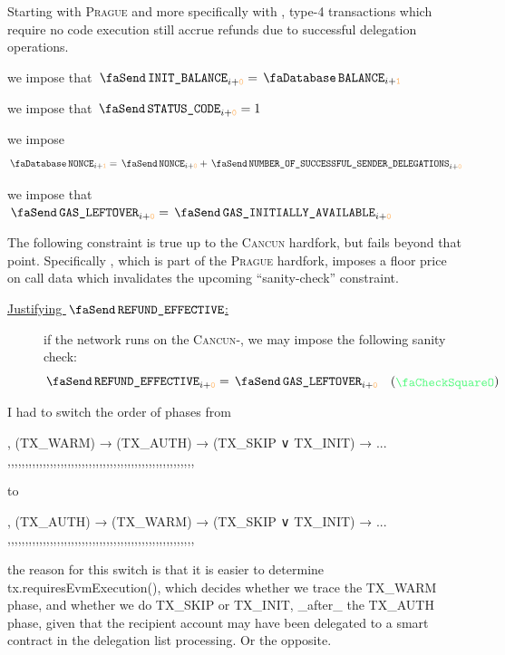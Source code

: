 \begin{description}
			\saNote{}
			Starting with \textsc{Prague} and more specifically with
			\cite{EIP-7702}, type-4 transactions which require no code execution
			still accrue refunds due to successful delegation operations.
		\item[\underline{Justifying $\txInitialBalance$:}]
			we impose that $\txInitialBalance _{i + \roffTxSkipUserTransaction} = \accBalance _{i + \roffTxSkipUserSenderAccount}$
		\item[\underline{Justifying \txStatusCode{}:}]
			we impose that $\txStatusCode _{i + \roffTxSkipUserTransaction} = 1$
		\item[\underline{Justifying \txNonce{}:}]
			we impose
			\[
				\accNonce                              _{i + \roffTxSkipUserSenderAccount} =
				\txNonce                               _{i + \roffTxSkipUserTransaction} +
				\txNumberOfSuccessfulSenderDelegations _{i + \roffTxSkipUserTransaction}
			\]
		\item[\underline{Justifying $\txLeftoverGas$:}]
			we impose that $\txLeftoverGas _{i + \roffTxSkipUserTransaction} = \txInitialGas _{i + \roffTxSkipUserTransaction}$
	\end{description}
	The following constraint is true up to the \textsc{Cancun} hardfork, but fails beyond that point.
	Specifically \cite{EIP-7623}, which is part of the \textsc{Prague} hardfork,
	imposes a floor price on call data
	which invalidates the upcoming ``sanity-check'' constraint.
	\begin{description}
		\item[\underline{Justifying $\txEffectiveRefund$:}]
			if the network runs on the \textsc{Cancun}-\evm{},
			we may impose the following sanity check:
			\[ \txEffectiveRefund _{i + \roffTxSkipUserTransaction} = \txLeftoverGas _{i + \roffTxSkipUserTransaction} \quad (\sanityCheck) \]
	\end{description}
	\iffalse
	I had to switch the order of phases from

	,   (TX_WARM) → (TX_AUTH) → (TX_SKIP ∨ TX_INIT) → ...
	,,,,,,,,,,,,,,,,,,,,,,,,,,,,,,,,,,,,,,,,,,,,,,,,,,,,,

	to 

	,   (TX_AUTH) → (TX_WARM) → (TX_SKIP ∨ TX_INIT) → ...
	,,,,,,,,,,,,,,,,,,,,,,,,,,,,,,,,,,,,,,,,,,,,,,,,,,,,,

	the reason for this switch is that it is easier to determine tx.requiresEvmExecution(), which decides whether we trace the TX_WARM phase, and whether we do TX_SKIP or TX_INIT, _after_ the TX_AUTH phase, given that the recipient account may have been delegated to a smart contract in the delegation list processing. Or the opposite.


